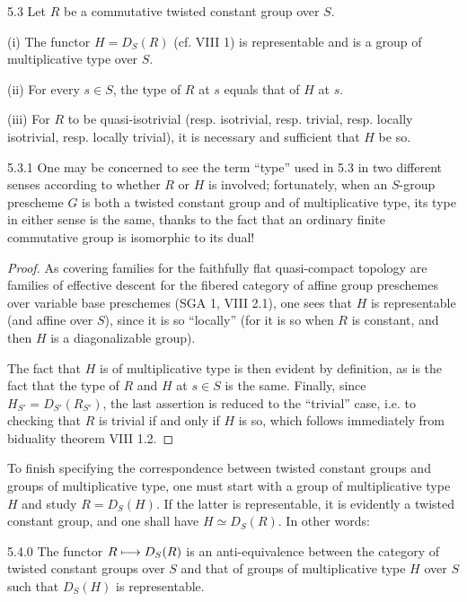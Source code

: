 \begin{proposition}{5.3}\label{X.5.3}
Let $R$ be a commutative twisted constant group over $S$.

(i) The functor $H=D_S(R)$ (cf. VIII 1) is representable and is a group of multiplicative type over $S$.

(ii) For every $s\in S$, the type of $R$ at $s$ equals that of $H$ at $s$.

(iii) For $R$ to be quasi-isotrivial (resp. isotrivial, resp. trivial, resp. locally isotrivial, resp. locally trivial), it is necessary and sufficient that $H$ be so.
\end{proposition}
\begin{remark}{5.3.1}\label{X.5.3.1}
 One may be concerned to see the term ``type'' used in 5.3 in two different senses according to whether $R$ or $H$ is involved; fortunately, when an $S$-group prescheme $G$ is both a twisted constant group and of multiplicative type, its type in either sense is the same, thanks to the fact that an ordinary finite commutative group is isomorphic to its dual!
\end{remark}
\begin{proof}
As covering families for the faithfully flat quasi-compact topology are families of effective descent for the fibered category of affine group preschemes over variable base preschemes (SGA 1, VIII 2.1), one sees that $H$ is representable (and affine over $S$), since it is so ``locally'' (for it is so when $R$ is constant, and then $H$ is a diagonalizable group).

The fact that $H$ is of multiplicative type is then evident by definition, as is the fact that the type of $R$ and $H$ at $s\in S$ is the same. Finally, since $H_{S'}=D_{S'}(R_{S'})$, the last assertion is reduced to the ``trivial'' case, i.e. to checking that $R$ is trivial if and only if $H$ is so, which follows immediately from biduality theorem VIII 1.2.
\end{proof}
To finish specifying the correspondence between twisted constant groups and groups of multiplicative type, one must start with a group of multiplicative type $H$ and study $R=D_S(H)$. If the latter is representable, it is evidently a twisted constant group, and one shall have $H\simeq D_S(R)$. In other words:
\begin{scholium}{5.4.0}\label{X.5.4.0}
The functor $R\longmapsto D_S(R)$ is an anti-equivalence between the category of twisted constant groups over $S$ and that of groups of multiplicative type $H$ over $S$ such that $D_S(H)$ is representable.
\end{scholium}

